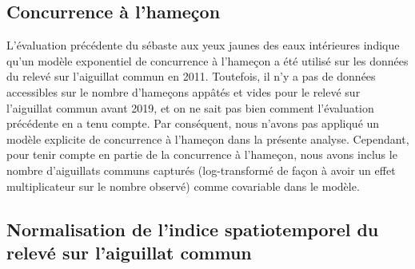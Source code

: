 \documentclass[french,11pt]{book}
\begin{document}
\hypertarget{sec:dog-hook-competition}{%
\subsection{Concurrence à l'hameçon}\label{sec:dog-hook-competition}}

L'évaluation précédente du sébaste aux yeux jaunes des eaux intérieures indique qu'un modèle exponentiel de concurrence à l'hameçon a été utilisé sur les données du relevé sur l'aiguillat commun en 2011. Toutefois, il n'y a pas de données accessibles sur le nombre d'hameçons appâtés et vides pour le relevé sur l'aiguillat commun avant 2019, et on ne sait pas bien comment l'évaluation précédente en a tenu compte. Par conséquent, nous n'avons pas appliqué un modèle explicite de concurrence à l'hameçon dans la présente analyse. Cependant, pour tenir compte en partie de la concurrence à l'hameçon, nous avons inclus le nombre d'aiguillats communs capturés (log-transformé de façon à avoir un effet multiplicateur sur le nombre observé) comme covariable dans le modèle.

\hypertarget{sec:dog-index-model}{%
\subsection{Normalisation de l'indice spatiotemporel du relevé sur l'aiguillat commun}\label{sec:dog-index-model}}
\end{document}
